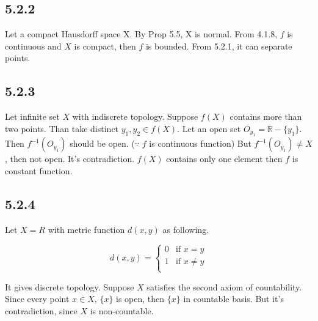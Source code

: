 \documentclass{article}
\begin{document}
\subsection*{5.2.2}

Let a compact Hausdorff space X. By Prop 5.5, X is normal. From 4.1.8, $f$ is continuous and $X$ is compact, then $f$ is bounded. From 5.2.1, it can separate points.

\subsection*{5.2.3}

Let infinite set $X$ with indiscrete topology. Suppose $f(X)$ contains more than two points. Than take distinct $y_1, y_2 \in f(X)$. Let an open set $O_{y_1}=\mathbb{R}-\{y_1\}$.
Then $f^{-1}(O_{y_1})$ should be open. ($\because$ $f$ is continuous function) But $f^{-1}(O_{y_1}) \neq X$, then not open. It's contradiction. $f(X)$ contains only one element then $f$ is constant function.

\subsection*{5.2.4}

Let $X=R$ with metric function $d(x,y)$ as following.

\[
d(x,y) =
\begin{cases}
0 & \text{if } x = y\\
1 & \text{if } x \neq y\\
\end{cases}
\]

It gives discrete topology. Suppose $X$ satisfies the second axiom of countability. Since every point $x\in X$, $\{x\}$ is open, then $\{x\}$ in countable basis. But it's contradiction, since $X$ is non-countable.
\end{document}
